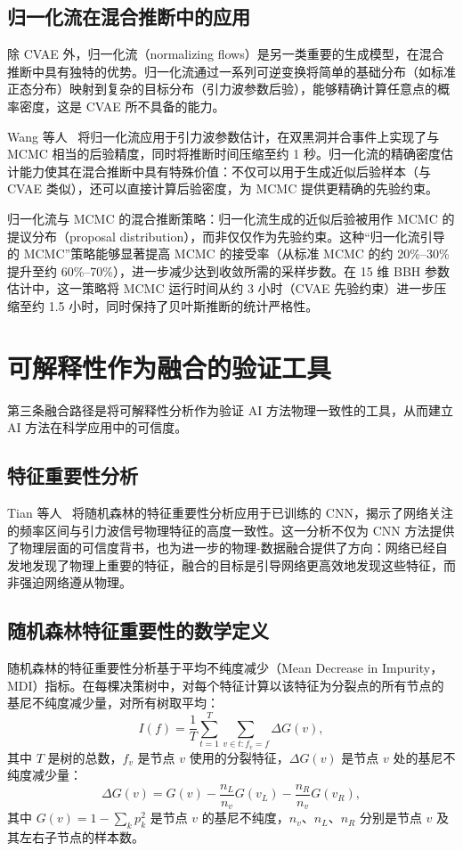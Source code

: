 \subsection{归一化流在混合推断中的应用}

除 CVAE 外，归一化流（normalizing flows）是另一类重要的生成模型，在混合推断中具有独特的优势。归一化流通过一系列可逆变换将简单的基础分布（如标准正态分布）映射到复杂的目标分布（引力波参数后验），能够精确计算任意点的概率密度，这是 CVAE 所不具备的能力。

Wang 等人~\cite{wang2022normflow} 将归一化流应用于引力波参数估计，在双黑洞并合事件上实现了与 MCMC 相当的后验精度，同时将推断时间压缩至约 1 秒。归一化流的精确密度估计能力使其在混合推断中具有特殊价值：不仅可以用于生成近似后验样本（与 CVAE 类似），还可以直接计算后验密度，为 MCMC 提供更精确的先验约束。

归一化流与 MCMC 的混合推断策略：归一化流生成的近似后验被用作 MCMC 的提议分布（proposal distribution），而非仅仅作为先验约束。这种“归一化流引导的 MCMC”策略能够显著提高 MCMC 的接受率（从标准 MCMC 的约 20\%--30\% 提升至约 60\%--70\%），进一步减少达到收敛所需的采样步数。在 15 维 BBH 参数估计中，这一策略将 MCMC 运行时间从约 3 小时（CVAE 先验约束）进一步压缩至约 1.5 小时，同时保持了贝叶斯推断的统计严格性。

\section{可解释性作为融合的验证工具}

第三条融合路径是将可解释性分析作为验证 AI 方法物理一致性的工具，从而建立 AI 方法在科学应用中的可信度。

\subsection{特征重要性分析}

Tian 等人~\cite{tian2025cnn} 将随机森林的特征重要性分析应用于已训练的 CNN，揭示了网络关注的频率区间与引力波信号物理特征的高度一致性。这一分析不仅为 CNN 方法提供了物理层面的可信度背书，也为进一步的物理-数据融合提供了方向：网络已经自发地发现了物理上重要的特征，融合的目标是引导网络更高效地发现这些特征，而非强迫网络遵从物理。

\subsection{随机森林特征重要性的数学定义}

随机森林的特征重要性分析基于平均不纯度减少（Mean Decrease in Impurity，MDI）指标。在每棵决策树中，对每个特征计算以该特征为分裂点的所有节点的基尼不纯度减少量，对所有树取平均：
\begin{equation}
I(f) = \frac{1}{T} \sum_{t=1}^T \sum_{v \in t: f_v = f} \Delta G(v),
\end{equation}
其中 $T$ 是树的总数，$f_v$ 是节点 $v$ 使用的分裂特征，$\Delta G(v)$ 是节点 $v$ 处的基尼不纯度减少量：
\begin{equation}
\Delta G(v) = G(v) - \frac{n_L}{n_v} G(v_L) - \frac{n_R}{n_v} G(v_R),
\end{equation}
其中 $G(v) = 1 - \sum_k p_k^2$ 是节点 $v$ 的基尼不纯度，$n_v$、$n_L$、$n_R$ 分别是节点 $v$ 及其左右子节点的样本数。

